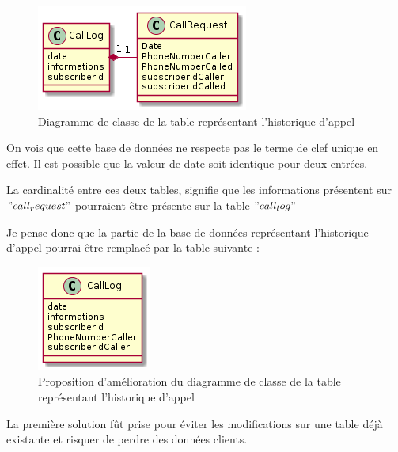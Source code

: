 \newpage
\begin{figure}[!h]
	\centering
	\includegraphics[scale=1]{img/classeCallLogOld.png}
	\caption{\label{class_callLog_old} Diagramme de classe de la table représentant l'historique d'appel}
\end{figure}

On vois que cette base de données ne respecte pas le terme de clef unique en effet. Il est possible que la valeur de date soit identique pour deux entrées.

La cardinalité entre ces deux tables, signifie que les informations présentent sur $"call_request"$ pourraient être présente sur la table $"call_log"$

Je pense donc que la partie de la base de données représentant l'historique d'appel pourrai être remplacé par la table suivante :

\begin{figure}[!h]
	\centering
	\includegraphics[scale=1]{img/classeCallLogNew.png}
	\caption{\label{class_callLog_new} Proposition d'amélioration du diagramme de classe de la table représentant l'historique d'appel}
\end{figure}

La première solution fût prise pour éviter les modifications sur une table déjà existante et risquer de perdre des données clients. 